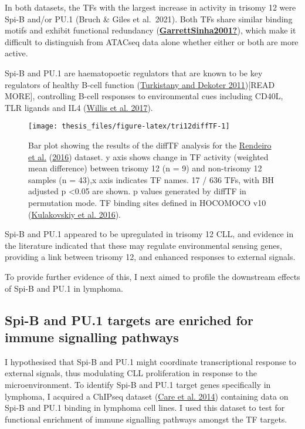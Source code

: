 \documentclass[11pt, a4paper, twosided]{book}
\begin{document}
In both datasets, the TFs with the largest increase in activity in trisomy 12 were Spi-B and/or PU.1 (Bruch \& Giles et al.~2021). Both TFs share similar binding motifs and exhibit functional redundancy (\protect\hyperlink{ref-GarrettSinha2001}{\textbf{GarrettSinha2001?}}), which make it difficult to distinguish from ATACseq data alone whether either or both are more active.

Spi-B and PU.1 are haematopoetic regulators that are known to be key regulators of healthy B-cell function (\protect\hyperlink{ref-Turkistany2011}{Turkistany and Dekoter 2011}){[}READ MORE{]}, controlling B-cell responses to environmental cues including CD40L, TLR ligands and IL4 (\protect\hyperlink{ref-Willis2017}{Willis et al. 2017}).


\begin{figure}

{\centering \texttt{[image: thesis\_files/figure-latex/tri12diffTF-1]} 

}

\caption{Bar plot showing the results of the diffTF analysis for the \protect\hyperlink{ref-Rendeiro2016}{Rendeiro et al.} (\protect\hyperlink{ref-Rendeiro2016}{2016}) dataset. y axis shows change in TF activity (weighted mean difference) between trisomy 12 (n = 9) and non-trisomy 12 samples (n = 43),x axis indicates TF names. 17 / 636 TFs, with BH adjusted p \textless0.05 are shown. p values generated by diffTF in permutation mode. TF binding sites defined in HOCOMOCO v10 (\protect\hyperlink{ref-HOCOMOCO}{Kulakovskiy et al. 2016}).}\label{fig:tri12diffTF}
\end{figure}
Spi-B and PU.1 appeared to be upregulated in trisomy 12 CLL, and evidence in the literature indicated that these may regulate environmental sensing genes, providing a link between trisomy 12, and enhanced responses to external signals.

To provide further evidence of this, I next aimed to profile the downstream effects of Spi-B and PU.1 in lymphoma.

\hypertarget{spi-b-and-pu.1-targets-are-enriched-for-immune-signalling-pathways}{%
\subsection{Spi-B and PU.1 targets are enriched for immune signalling pathways}\label{spi-b-and-pu.1-targets-are-enriched-for-immune-signalling-pathways}}

I hypothesised that Spi-B and PU.1 might coordinate transcriptional response to external signals, thus modulating CLL proliferation in response to the microenvironment. To identify Spi-B and PU.1 target genes specifically in lymphoma, I acquired a ChIPseq dataset (\protect\hyperlink{ref-Care2014}{Care et al. 2014}) containing data on Spi-B and PU.1 binding in lymphoma cell lines. I used this dataset to test for functional enrichment of immune signalling pathways amongst the TF targets.
\end{document}
